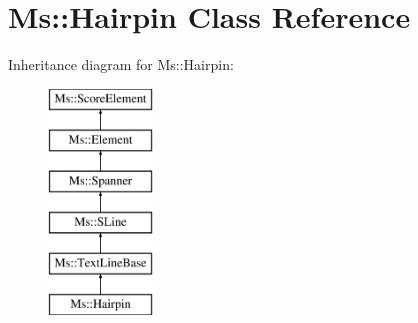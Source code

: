 \hypertarget{class_ms_1_1_hairpin}{}\section{Ms\+:\+:Hairpin Class Reference}
\label{class_ms_1_1_hairpin}
Inheritance diagram for Ms\+:\+:Hairpin\+:\begin{figure}[H]
\begin{center}
\leavevmode
\includegraphics[height=6.000000cm]{class_ms_1_1_hairpin}
\end{center}
\end{figure}
